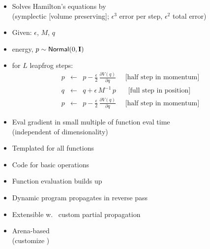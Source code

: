 \documentclass[10pt]{report}
\begin{document}
\begin{itemize}
\item Solves Hamilton's equations by 
  \\
  {\footnotesize (symplectic [volume preserving]; $\epsilon^3$ error per step, $\epsilon^2$ total error)}
\item Given:  $\epsilon$,  $M$,  $q$
\item {} energy, $p \sim {\sf
    Normal}(0,\mbox{\bf I})$
\item {} for $L$ leapfrog steps:
  \begin{eqnarray*}
    p & \leftarrow &
    p - \frac{\epsilon}{2} \, \frac{\partial V(q)}{\partial q}
    \ \ \ \ \ \ \mbox{[half step in momentum]}
    \\[6pt]
    q & \leftarrow &
    q + \epsilon \, M^{-1} \, p
    \ \ \ \ \ \ \ \  \mbox{[full step in position]}
    \\[6pt]
    p & \leftarrow &
    p - \frac{\epsilon}{2} \, \frac{\partial V(q)}{\partial q}
    \ \ \ \ \ \ \mbox{[half step in momentum]}
  \end{eqnarray*}
\end{itemize}


\begin{itemize}
\item Eval gradient in small multiple of function eval time
  \\
  {\footnotesize (independent of dimensionality)}
\item Templated  for all functions
\item Code  for basic operations
\item Function evaluation builds up 
\item Dynamic program propagates  in reverse pass
\item Extensible w.\  custom partial propagation
\item Arena-based 
  \\ {\footnotesize (customize )}
\end{itemize}
\end{document}
